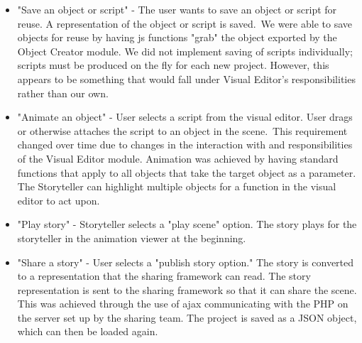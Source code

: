 \documentclass[12pt]{article}
\begin{document}
\begin{itemize}
\item "Save an object or script" - The user wants to save an object or script for reuse. A representation of the object or script is saved.\
We were able to save objects for reuse by having js functions "grab" the object exported by the Object Creator module. We did not implement saving of scripts individually; scripts must be produced on the fly for each new project. However, this appears to be something that would fall under Visual Editor's responsibilities rather than our own.

\item "Animate an object" -  User selects a script from the visual editor. User drags or otherwise attaches the script to an object in the scene.\
This requirement changed over time due to changes in the interaction with and responsibilities of the Visual Editor module. Animation was achieved by having standard functions that apply to all objects that take the target object as a parameter. The Storyteller can highlight multiple objects for a function in the visual editor to act upon.

\item "Play story" - Storyteller selects a "play scene" option. The story plays for the storyteller in the animation viewer at the beginning.\

\item "Share a story" - User selects a "publish story option." The story is converted to a representation that the sharing framework can read. The story representation is sent to the sharing framework so that it can share the scene.
This was achieved through the use of ajax communicating with the PHP on the server set up by the sharing team. The project is saved as a JSON object, which can then be loaded again.
\end{itemize}
\end{document}
